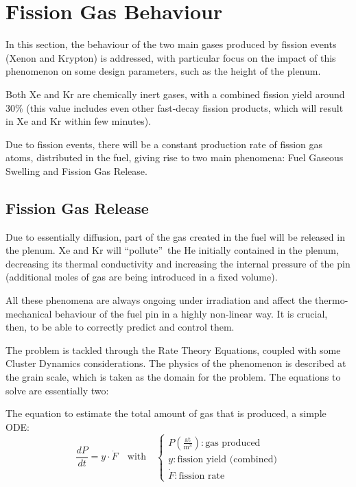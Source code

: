 \section{Fission Gas Behaviour}

In this section, the behaviour of the two main gases produced by fission events (Xenon and Krypton) is addressed, with particular focus on the impact of this phenomenon on some design parameters, such as the height of the plenum.

Both Xe and Kr are chemically inert gases, with a combined fission yield around 30\% (this value includes even other fast-decay fission products, which will result in Xe and Kr within few minutes).

Due to fission events, there will be a constant production rate of fission gas atoms, distributed in the fuel, giving rise to two main phenomena: Fuel Gaseous Swelling and Fission Gas Release.

\subsection{Fission Gas Release}

Due to essentially diffusion, part of the gas created in the fuel will be released in the plenum. Xe and Kr will \textquotedblleft pollute\textquotedblright\ the He initially contained in the plenum, decreasing its thermal conductivity and increasing the internal pressure of the pin (additional moles of gas are being introduced in a fixed volume).

All these phenomena are always ongoing under irradiation and affect the thermo-mechanical behaviour of the fuel pin in a highly non-linear way. It is crucial, then, to be able to correctly predict and control them.

The problem is tackled through the Rate Theory Equations, coupled with some Cluster Dynamics considerations. The physics of the phenomenon is described at the grain scale, which is taken as the domain for the problem. The equations to solve are essentially two:

The equation to estimate the total amount of gas that is produced, a simple ODE:
\begin{equation}
    \frac{dP}{dt} = y \cdot \dot{F} \quad \text{with} \quad 
    \begin{cases}
        P \left(\frac{\text{at}}{\text{m}^3}\right): \text{gas produced} \\
        y: \text{fission yield (combined)} \\
        \dot{F}: \text{fission rate}
    \end{cases}
\end{equation}

